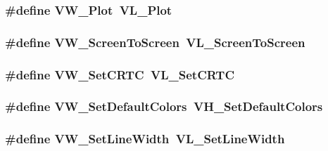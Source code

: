 \label{ID__VH_8H_a9e4bfc81697f8b787245b53d54e2fcc8}
\hypertarget{ID__VH_8H_aca69acdcdaa8f0173ed5e994537e2154}{
\subsubsection[{VW\_\-Plot}]{\setlength{\rightskip}{0pt plus 5cm}\#define VW\_\-Plot~VL\_\-Plot}}
\label{ID__VH_8H_aca69acdcdaa8f0173ed5e994537e2154}
\hypertarget{ID__VH_8H_a1616c0f27ab41adc67c37946ddd9c7ba}{
\subsubsection[{VW\_\-ScreenToScreen}]{\setlength{\rightskip}{0pt plus 5cm}\#define VW\_\-ScreenToScreen~VL\_\-ScreenToScreen}}
\label{ID__VH_8H_a1616c0f27ab41adc67c37946ddd9c7ba}
\hypertarget{ID__VH_8H_ae207cd9a9b77b1e6c04984fdd5b707a1}{
\subsubsection[{VW\_\-SetCRTC}]{\setlength{\rightskip}{0pt plus 5cm}\#define VW\_\-SetCRTC~VL\_\-SetCRTC}}
\label{ID__VH_8H_ae207cd9a9b77b1e6c04984fdd5b707a1}
\hypertarget{ID__VH_8H_a9941159678d27e9d5cecab32190f4b41}{
\subsubsection[{VW\_\-SetDefaultColors}]{\setlength{\rightskip}{0pt plus 5cm}\#define VW\_\-SetDefaultColors~VH\_\-SetDefaultColors}}
\label{ID__VH_8H_a9941159678d27e9d5cecab32190f4b41}
\hypertarget{ID__VH_8H_a98a09505d8a48143499087c1a4394533}{
\subsubsection[{VW\_\-SetLineWidth}]{\setlength{\rightskip}{0pt plus 5cm}\#define VW\_\-SetLineWidth~VL\_\-SetLineWidth}}
